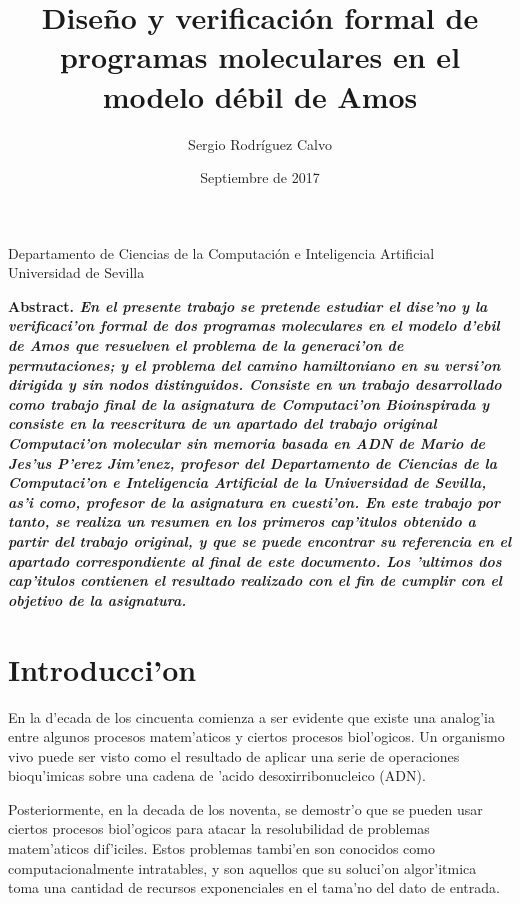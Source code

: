 \documentclass[12pt]{article}
\title{Dise\~no y verificaci\'on formal de programas moleculares en el modelo d\'ebil de Amos}
\author{Sergio Rodr\'iguez Calvo}
\date{Septiembre de 2017}
\begin{document}
    \maketitle
    \thispagestyle{empty}
    \begin{center}
      Departamento de Ciencias de la Computaci\'on e
      Inteligencia Artificial \\
      Universidad de Sevilla
      \end{center}
  \bf{Abstract. }\rm
    \emph{En el presente trabajo se pretende estudiar el dise'no y la verificaci'on formal
    de dos programas moleculares en el modelo d'ebil de Amos que resuelven el problema de la generaci'on
    de permutaciones; y el problema del camino hamiltoniano en su versi'on dirigida y sin
    nodos distinguidos. Consiste en un trabajo desarrollado como trabajo final de la asignatura de
    Computaci'on Bioinspirada y consiste en la reescritura de un apartado del trabajo original
    Computaci'on molecular sin memoria basada en ADN de Mario de Jes'us P'erez Jim'enez, profesor
    del Departamento de Ciencias de la Computaci'on e Inteligencia Artificial de la
    Universidad de Sevilla, as'i como, profesor de la asignatura en cuesti'on.
    En este trabajo por tanto, se realiza un resumen en los primeros cap'itulos obtenido a partir
    del trabajo original, y que se puede encontrar su referencia en el apartado correspondiente
    al final de este documento. Los 'ultimos dos cap'itulos contienen el resultado realizado con el
    fin de cumplir con el objetivo de la asignatura. }

\section{Introducci'on}

En la d'ecada de los cincuenta comienza a ser evidente que existe una analog'ia entre algunos procesos
matem'aticos y ciertos procesos biol'ogicos. Un organismo vivo puede ser visto como el resultado de
aplicar una serie de operaciones bioqu'imicas sobre una cadena de 'acido desoxirribonucleico (ADN).

Posteriormente, en la decada de los noventa, se demostr'o que se pueden usar ciertos procesos biol'ogicos
para atacar la resolubilidad de problemas matem'aticos dif'iciles. Estos problemas tambi'en son conocidos
como computacionalmente intratables, y son aquellos que su soluci'on algor'itmica toma una cantidad de
recursos exponenciales en el tama'no del dato de entrada.
\end{document}
